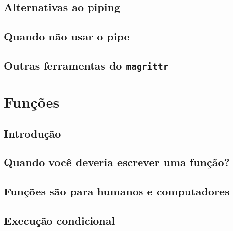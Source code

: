 \documentclass[
]{latex/krantz}
\theoremstyle{definition}
\theoremstyle{definition}
\theoremstyle{definition}
\theoremstyle{definition}
\theoremstyle{remark}
\begin{document}
\hypertarget{alternativas-ao-piping}{%
\section{Alternativas ao piping}\label{alternativas-ao-piping}}

\hypertarget{quando-nuxe3o-usar-o-pipe}{%
\section{Quando não usar o pipe}\label{quando-nuxe3o-usar-o-pipe}}

\hypertarget{outras-ferramentas-do-magrittr}{%
\section{\texorpdfstring{Outras ferramentas do \texttt{magrittr}}{Outras ferramentas do magrittr}}\label{outras-ferramentas-do-magrittr}}

\hypertarget{funuxe7uxf5es}{%
\chapter{Funções}\label{funuxe7uxf5es}}

\hypertarget{introduuxe7uxe3o-11}{%
\section{Introdução}\label{introduuxe7uxe3o-11}}

\hypertarget{quando-vocuxea-deveria-escrever-uma-funuxe7uxe3o}{%
\section{Quando você deveria escrever uma função?}\label{quando-vocuxea-deveria-escrever-uma-funuxe7uxe3o}}

\hypertarget{funuxe7uxf5es-suxe3o-para-humanos-e-computadores}{%
\section{Funções são para humanos e computadores}\label{funuxe7uxf5es-suxe3o-para-humanos-e-computadores}}

\hypertarget{execuuxe7uxe3o-condicional}{%
\section{Execução condicional}\label{execuuxe7uxe3o-condicional}}
\end{document}
